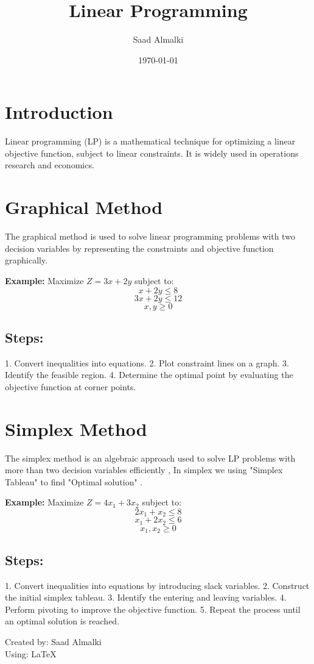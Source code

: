\documentclass[12pt]{article}
\title{Linear Programming}
\author{Saad Almalki}
\date{\today}
\begin{document}
\maketitle

\section{Introduction} 
Linear programming (LP) is a mathematical technique for optimizing a linear objective function, subject to linear constraints. It is widely used in operations research and economics.

\section{Graphical Method} 
The graphical method is used to solve linear programming problems with two decision variables by representing the constraints and objective function graphically.

\textbf{Example:} Maximize \( Z = 3x + 2y \) subject to:
\[
  x + 2y \leq 8
\]
\[
  3x + 2y \leq 12
\]
\[
  x, y \geq 0
\]

\subsection{Steps:}
1. Convert inequalities into equations.
2. Plot constraint lines on a graph.
3. Identify the feasible region.
4. Determine the optimal point by evaluating the objective function at corner points.

\section{Simplex Method}
The simplex method is an algebraic approach used to solve LP problems with more than two decision variables efficiently , In simplex we using "Simplex Tableau" to find "Optimal solution" .

\textbf{Example:} Maximize \( Z = 4x_1 + 3x_2 \) subject to:
\[
  2x_1 + x_2 \leq 8
\]
\[
  x_1 + 2x_2 \leq 6
\]
\[
  x_1, x_2 \geq 0
\]

\subsection{Steps:}
1. Convert inequalities into equations by introducing slack variables.
2. Construct the initial simplex tableau.
3. Identify the entering and leaving variables.
4. Perform pivoting to improve the objective function.
5. Repeat the process until an optimal solution is reached.

\begin{flushright}
Created by: Saad Almalki \\
Using: \LaTeX
\end{flushright}
\end{document}
